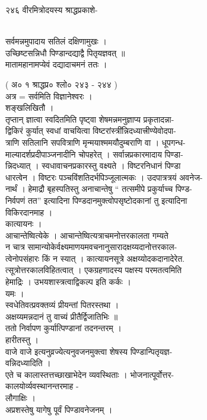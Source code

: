 \documentclass[11pt, openany]{book}
\begin{document}
{{{{{{२४६ वीरमित्रोदयस्य श्राद्धप्रकाशे-}{\\
सर्वमन्नमुपादाय सतिलं दक्षिणामुखः ।\\
उच्छिष्टसन्निधौ पिण्डान्दद्याद्वै पितृयज्ञवत् ॥\\
मातामहानामप्येवं दद्यादाचमनं ततः ।

{ ( अ० १ श्राद्धप्र० श्लो० २४३ - २४४ )\\
अत्र = सर्वमिति विज्ञानेश्वरः ।\\
शङ्खलिखितौ ।\\
तृप्तान् ज्ञात्वा स्वदितमिति पृष्ट्वा शेषमन्नमनुज्ञाप्य प्रकृतादन्ना-\\
द्विकिरं कुर्यात् स्वधां वाचयित्वा
विष्टरांस्त्रींन्निदध्यात्त्रीण्येवोदपा-\\
त्राणि सतिलानि सपवित्राणि मृन्मयाश्ममयौदुम्बराणि वा । धूपगन्ध-\\
माल्यादर्शप्रदीपाञ्जनादीनि चोपहरेत् । सर्वान्नप्रकारमादाय पिण्डा-\\
न्निदध्यात् । स्वधावाचनप्रकारस्तु वक्ष्यते । विष्टरनिधानं पिण्डा\\
धारत्वेन । विष्टरः पञ्चविंशतिदर्भपिञ्जूलात्मकः । उदपात्रत्रयं अवनेज-\\
नार्थं । हेमाद्रौ बृहस्पतिस्तु अनाचान्तेषु `` तत्समीपे प्रकुर्याच्च
पिण्ड-\\
निर्वपणं तत'' इत्यादिना पिण्डदानमुक्त्वोपसृष्टोदकानां तु इत्यादिना\\
विकिरदानमाह ।\\
कात्यायनः ।\\
आचान्तेष्वित्येके । आचान्तेष्वित्यत्राचमनोत्तरकालता गम्यते\\
न चात्र सामान्योकेर्वक्ष्यमाणयमवचनानुसारादक्षय्यदानोत्तरकाल-\\
त्वेनोपसंहारः किं न स्यात् । कात्यायनसूत्रे अक्षय्योदकदानादेरेत.\\
त्सूत्रोत्तरकालविहितत्वात् । एकग्रहणादस्य पक्षस्य परमतत्वमिति\\
हेमाद्रिः । उभयशास्त्रत्वाद्विकल्प इति कर्कः ।\\
यमः ।\\
स्वधेतिवत्प्रवक्तव्यं प्रीयन्तां पितरस्तथा ।\\
अक्षय्यमन्नदानं तु वाच्यं प्रीतैर्द्विजातिभिः ॥\\
ततो निर्वापण कुर्यात्पिण्डानां तदनन्तरम् ।\\
हारीतस्तु ।\\
वाजे वाजे इत्यनुव्रज्येत्यनुवजनमुक्त्वा शेषस्य पिण्डान्पितृयज्ञ-\\
वन्निदध्यादिति ।\\
एते च कालास्तत्तच्छाखाभेदेन व्यवस्थिताः । भोजनात्पूर्वोत्तर-\\
कालयोर्व्यवस्थानन्तरमाह -\\
लौगाक्षिः ।\\
अप्रशस्तेषु यागेषु पूर्वं पिण्डावनेजनम् ।

}}}}}}}
\end{document}
